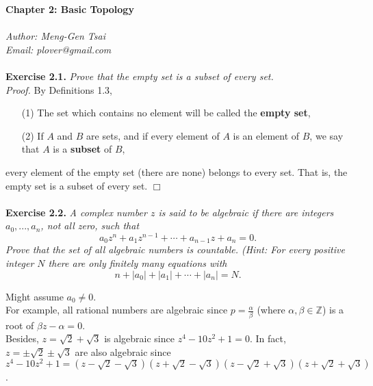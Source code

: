 \documentclass{article}
\begin{document}
\textbf{\Large Chapter 2: Basic Topology} \\\\



\emph{Author: Meng-Gen Tsai} \\
\emph{Email: plover@gmail.com} \\\\



\textbf{Exercise 2.1.}
\emph{Prove that the empty set is a subset of every set.} \\

\emph{Proof.}
By Definitions 1.3,
\begin{enumerate}
\item[(1)]
The set which contains no element will be called the \textbf{empty set},
\item[(2)]
If $A$ and $B$ are sets, and if every element of $A$ is an element of $B$,
we say that $A$ is a \textbf{subset} of $B$,
\end{enumerate}
every element of the empty set (there are none) belongs to every set.
That is, the empty set is a subset of every set.
$\Box$ \\\\






\textbf{Exercise 2.2.}
\emph{A complex number $z$ is said to be algebraic if there are integers
$a_0, ..., a_n$, not all zero, such that
$$a_0 z^n + a_1 z^{n-1} + \cdots + a_{n-1} z + a_n = 0.$$
Prove that the set of all algebraic numbers is countable.
(Hint: For every positive integer $N$ there are only finitely many equations with
$$n + |a_0| + |a_1| + \cdots + |a_n| = N.$$}

Might assume $a_0 \neq 0$. \\

For example, all rational numbers are algebraic
since $p = \frac{\alpha}{\beta}$ (where $\alpha, \beta \in \mathbb{Z}$)
is a root of $\beta z - \alpha = 0$. \\

Besides, $z = \sqrt{2} + \sqrt{3}$ is algebraic since $z^4 - 10z^2 + 1 = 0$.
In fact, $z = \pm\sqrt{2} \pm\sqrt{3}$ are also algebraic since
$z^4 - 10z^2 + 1 =
(z - \sqrt{2} - \sqrt{3})(z + \sqrt{2} - \sqrt{3})
(z - \sqrt{2} + \sqrt{3})(z + \sqrt{2} + \sqrt{3})$. \\
\end{document}
